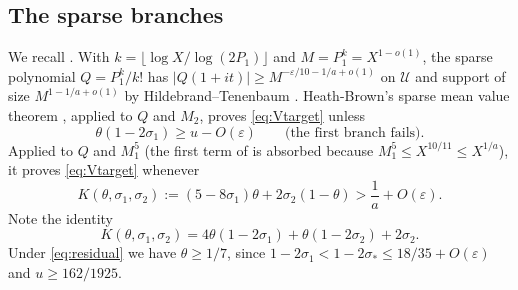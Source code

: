 \documentclass[11pt,a4paper]{amsart}
\theoremstyle{definition}
\newcommand{\e}{\varepsilon}
\newcommand{\1}{\mathbf 1}
\newcommand{\cU}{\mathcal U}
\begin{document}
\subsection{The sparse branches}
We recall \cite[Section~5.3]{MT}.  With
\(k=\lfloor\log X/\log(2P_1)\rfloor\) and \(M=P_1^k=X^{1-o(1)}\), the
sparse polynomial \(Q=P_1^k/k!\) has
\(|Q(1+it)|\ge M^{-\e/10-1/a+o(1)}\) on \(\cU\) and support of size
\(M^{1-1/a+o(1)}\) by Hildebrand--Tenenbaum \cite{HT}.  Heath-Brown's
sparse mean value theorem \cite[Theorem~4]{HB}, applied to \(Q\) and
\(M_2\), proves \eqref{eq:Vtarget} unless
\begin{equation}\label{eq:residual}
 \theta(1-2\sigma_1)\ge u-O(\e)
 \qquad\text{(the first branch fails).}
\end{equation}
Applied to \(Q\) and \(M_1^5\) (the first term of \cite[Lemma~3.4]{MT} is
absorbed because \(M_1^5\le X^{10/11}\le X^{1/a}\)), it proves
\eqref{eq:Vtarget} whenever
\begin{equation}\label{eq:key}
 K(\theta,\sigma_1,\sigma_2):=(5-8\sigma_1)\theta+2\sigma_2(1-\theta)
 >\frac1a+O(\e).
\end{equation}
Note the identity
\begin{equation}\label{eq:identity}
 K(\theta,\sigma_1,\sigma_2)=4\theta(1-2\sigma_1)+\theta(1-2\sigma_2)+2\sigma_2 .
\end{equation}
Under \eqref{eq:residual} we have \(\theta\ge1/7\), since
\(1-2\sigma_1<1-2\sigma_*\le18/35+O(\e)\) and \(u\ge162/1925\).
\end{document}
